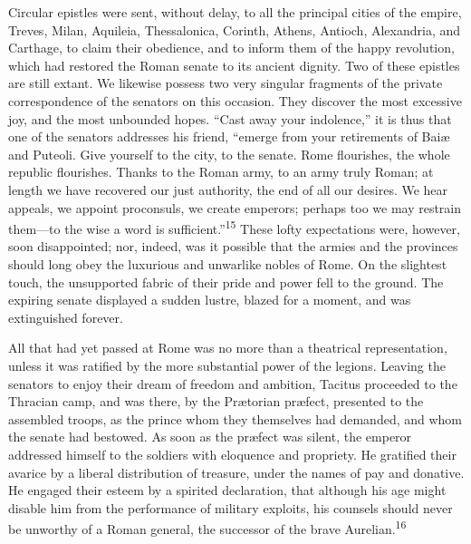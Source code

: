 
Circular epistles were sent, without delay, to all the principal
cities of the empire, Treves, Milan, Aquileia, Thessalonica,
Corinth, Athens, Antioch, Alexandria, and Carthage, to claim
their obedience, and to inform them of the happy revolution,
which had restored the Roman senate to its ancient dignity. Two
of these epistles are still extant. We likewise possess two very
singular fragments of the private correspondence of the senators
on this occasion. They discover the most excessive joy, and the
most unbounded hopes. “Cast away your indolence,” it is thus that
one of the senators addresses his friend, “emerge from your
retirements of Baiæ and Puteoli. Give yourself to the city, to
the senate. Rome flourishes, the whole republic flourishes.
Thanks to the Roman army, to an army truly Roman; at length we
have recovered our just authority, the end of all our desires. We
hear appeals, we appoint proconsuls, we create emperors; perhaps
too we may restrain them—to the wise a word is sufficient.”\textsuperscript{15}
These lofty expectations were, however, soon disappointed; nor,
indeed, was it possible that the armies and the provinces should
long obey the luxurious and unwarlike nobles of Rome. On the
slightest touch, the unsupported fabric of their pride and power
fell to the ground. The expiring senate displayed a sudden
lustre, blazed for a moment, and was extinguished forever.


All that had yet passed at Rome was no more than a theatrical
representation, unless it was ratified by the more substantial
power of the legions. Leaving the senators to enjoy their dream
of freedom and ambition, Tacitus proceeded to the Thracian camp,
and was there, by the Prætorian præfect, presented to the
assembled troops, as the prince whom they themselves had
demanded, and whom the senate had bestowed. As soon as the
præfect was silent, the emperor addressed himself to the soldiers
with eloquence and propriety. He gratified their avarice by a
liberal distribution of treasure, under the names of pay and
donative. He engaged their esteem by a spirited declaration, that
although his age might disable him from the performance of
military exploits, his counsels should never be unworthy of a
Roman general, the successor of the brave Aurelian.\textsuperscript{16}

